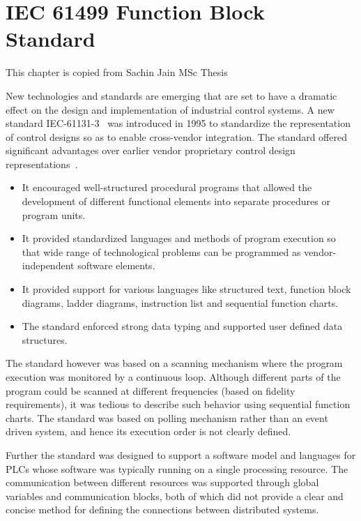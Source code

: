 \chapter{IEC 61499 Function Block Standard}
\label{functionblocks}

\begin{bf}
{This chapter is copied from Sachin Jain MSc Thesis}
\end{bf}

New technologies and standards are emerging that are set to have a
dramatic effect on the design and implementation of industrial
control systems. A new standard IEC-61131-3~\cite{IEC-61131-3} was
introduced in 1995 to standardize the representation of control
designs so as to enable cross-vendor integration. The standard
offered significant advantages over earlier vendor proprietary
control design representations~\cite{Book-61131}.
\begin{itemize}
\item It encouraged well-structured procedural
programs that allowed the development of different functional
elements into separate procedures or program units.
\item It provided standardized languages and methods of program execution
so that wide range of technological problems can be programmed as
vendor-independent software elements.
\item It provided support for various languages like structured
text, function block diagrams, ladder diagrams, instruction list
and sequential function charts.
\item The standard enforced strong data typing and supported user defined
data structures.
\end{itemize}

The standard however was based on a scanning mechanism where the
program execution was monitored by a continuous loop. Although
different parts of the program could be scanned at different
frequencies (based on fidelity requirements), it was tedious to
describe such behavior using sequential function charts. The
standard was based on polling mechanism rather than an event
driven system, and hence its execution order is not clearly
defined.

Further the standard was designed to support a software model and
languages for PLCs whose software was typically running on a
single processing resource. The communication between different
resources was supported through global variables and communication
blocks, both of which did not provide a clear and concise method
for defining the connections between distributed systems.

